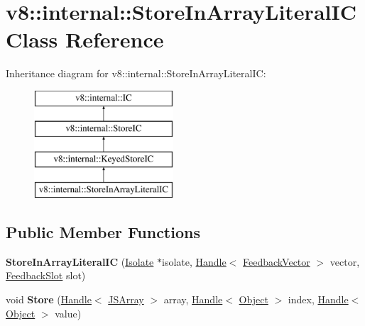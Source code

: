 \hypertarget{classv8_1_1internal_1_1StoreInArrayLiteralIC}{}\section{v8\+:\+:internal\+:\+:Store\+In\+Array\+Literal\+IC Class Reference}
\label{classv8_1_1internal_1_1StoreInArrayLiteralIC}
Inheritance diagram for v8\+:\+:internal\+:\+:Store\+In\+Array\+Literal\+IC\+:\begin{figure}[H]
\begin{center}
\leavevmode
\includegraphics[height=4.000000cm]{classv8_1_1internal_1_1StoreInArrayLiteralIC}
\end{center}
\end{figure}
\subsection*{Public Member Functions}
\begin{DoxyCompactItemize}
\item 
\mbox{\label{classv8_1_1internal_1_1StoreInArrayLiteralIC_a85e1abc0d40add3dec0f00c08c89abd2}} 
{\bfseries Store\+In\+Array\+Literal\+IC} (\mbox{\hyperlink{classv8_1_1internal_1_1Isolate}{Isolate}} $\ast$isolate, \mbox{\hyperlink{classv8_1_1internal_1_1Handle}{Handle}}$<$ \mbox{\hyperlink{classv8_1_1internal_1_1FeedbackVector}{Feedback\+Vector}} $>$ vector, \mbox{\hyperlink{classv8_1_1internal_1_1FeedbackSlot}{Feedback\+Slot}} slot)
\item 
\mbox{\label{classv8_1_1internal_1_1StoreInArrayLiteralIC_a02b654028ee90d66170a2000b0363772}} 
void {\bfseries Store} (\mbox{\hyperlink{classv8_1_1internal_1_1Handle}{Handle}}$<$ \mbox{\hyperlink{classv8_1_1internal_1_1JSArray}{J\+S\+Array}} $>$ array, \mbox{\hyperlink{classv8_1_1internal_1_1Handle}{Handle}}$<$ \mbox{\hyperlink{classv8_1_1internal_1_1Object}{Object}} $>$ index, \mbox{\hyperlink{classv8_1_1internal_1_1Handle}{Handle}}$<$ \mbox{\hyperlink{classv8_1_1internal_1_1Object}{Object}} $>$ value)
\end{DoxyCompactItemize}
